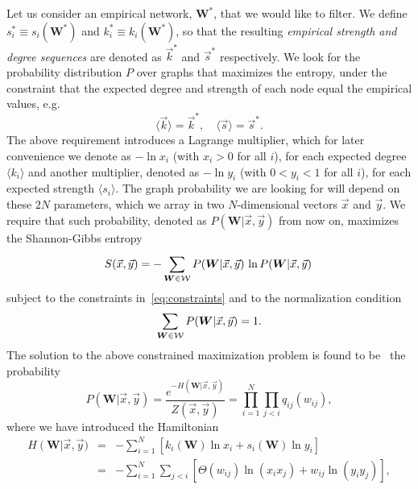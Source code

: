 \documentclass[aps,twocolumn,superscriptaddress]{revtex4-1}
\begin{document}
Let us consider an empirical network, $\bm{W}^{\ast}$, that we would like to filter.
We define $s^{\ast}_i\equiv s_i(\bm{W}^{\ast})$ and $k^{\ast}_i\equiv k_i(\bm{W}^{\ast})$, so that the resulting \emph{empirical strength and degree sequences} are denoted as $\vec{k}^{\ast}$ and $\vec{s}^{\ast}$ respectively.
We look for the probability distribution $P$ over graphs that maximizes the entropy, under the constraint that the expected degree and strength of each node equal the empirical values, e.g. 
\begin{equation}
\langle \vec{k}\rangle=\vec{k}^{\ast},\quad \langle \vec{s}\rangle=\vec{s}^{\ast}.
\label{eq:constraints}
\end{equation}
The above requirement introduces a Lagrange multiplier, which for later convenience we denote as $-\ln x_i$ (with $x_i>0$ for all $i$), for each expected degree $\langle k_i\rangle$ and another multiplier, denoted as $-\ln y_i$ (with $0<y_i<1$ for all $i$), for each expected strength $\langle s_i\rangle$. 
The graph probability we are looking for will depend on these $2N$ parameters, which we array in two $N$-dimensional vectors $\vec{x}$ and $\vec{y}$.
We require that such probability, denoted as  $P(\bm{W} | \vec{x},\vec{y})$ from now on, maximizes the Shannon-Gibbs entropy 
\begin{equation}
S(\vec{x},\vec{y}) = - \sum_{\bm{W}\in \cal{W}}^{} P(\bm{W} | \vec{x},\vec{y}) \, \ln P(\bm{W} | \vec{x},\vec{y}) \,
\label{eq:entropy}
\end{equation}
subject to the constraints in~\eqref{eq:constraints} and to the normalization condition
\begin{equation}
\sum_{{\bm W}\in\cal{W}}P(\bm{W} | \vec{x},\vec{y})=1.
\end{equation}
%
The solution to the above constrained maximization problem is found to be~\cite{bose-fermi,mastrandrea-njp-2014,squartini-njp-2015} the probability
\begin{equation}
%
P(\bm{W}|\vec{x},\vec{y}) = \dfrac{e^{-H \left( \bm{W}|\vec{x},\vec{y} \right)}}{Z(\vec{x},\vec{y})}=\prod_{i=1}^N \prod_{j<i} q_{ij}(w_{ij}),
\label{eq:graph_prob}
\end{equation}
where we have introduced the Hamiltonian
\begin{eqnarray}
%
H \left( \bm{W} \right|\vec{x},\vec{y})& =& -\sum_{i=1}^{N}\left[ k_i\left( \bm{W} \right)\ln x_i + s_i \left( \bm{W} \right)\ln y_i\right]\\
& =& -\sum_{i=1}^N\sum_{j<i} \left[ \Theta(w_{ij})\ln(x_i x_j)+  w_{ij}\ln(y_iy_j) \right],\nonumber
%
\end{eqnarray}
\end{document}
